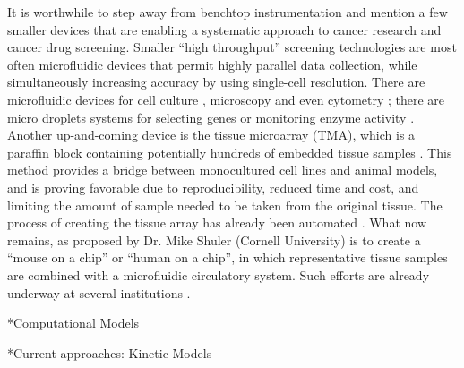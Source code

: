 \documentclass[12pt]{article}
\makeatletter
\renewcommand\subsection{\@startsection
	{subsection}{2}{0mm}
	{-0.05in}
	{-0.5\baselineskip}
	{\normalfont\normalsize\bfseries}}
\renewcommand\section{\@startsection
	{subsection}{2}{0mm}
	{-0.2in}
	{0.05\baselineskip}
	{\normalfont\large\bfseries}}
\makeatother
\begin{document}
It is worthwhile to step away from benchtop instrumentation and mention a few smaller devices that are enabling a systematic approach to cancer research and cancer drug screening. Smaller \textquotedblleft high throughput\textquotedblright \: screening technologies are most often microfluidic devices that permit highly parallel data collection, while simultaneously increasing accuracy by using single-cell resolution. There are microfluidic devices for cell culture \cite{Wu2010}, microscopy \cite{Di-Caprio2013} and even cytometry \cite{Ehrlich2011}; there are micro droplets systems for selecting genes \cite{Fallah-Araghi2012} or monitoring enzyme activity \cite{Agresti2010,Zagnoni2011}. Another up-and-coming device is the tissue microarray (TMA), which is a paraffin block containing potentially hundreds of embedded tissue samples \cite{Jawhar2009}. This method provides a bridge between monocultured cell lines and animal models, and is proving favorable due to reproducibility, reduced time and cost, and limiting the amount of sample needed to be taken from the original tissue. The process of creating the tissue array has already been automated \cite{Jawhar2009}. What now remains, as proposed by Dr. Mike Shuler (Cornell University) is to create a \textquotedblleft mouse on a chip\textquotedblright \: or \textquotedblleft human on a chip\textquotedblright, in which representative tissue samples are combined with a microfluidic circulatory system. Such efforts are already underway at several institutions \cite{Baker2011}.

\section*{Computational Models}

\subsection*{Current approaches: Kinetic Models} 
\end{document}
